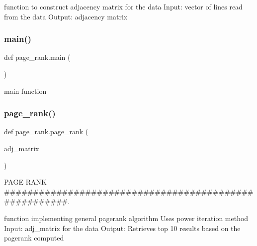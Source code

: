 \begin{DoxyVerb}function to construct adjacency matrix for the data
    Input: vector of lines read from the data
    Output: adjacency matrix
\end{DoxyVerb}
 \mbox{\label{namespacepage__rank_a8bd06af55f4293afdc3cc94d83cd6adc}} 
\subsubsection{\texorpdfstring{main()}{main()}}
{\footnotesize\ttfamily def page\+\_\+rank.\+main (\begin{DoxyParamCaption}{ }\end{DoxyParamCaption})}

\begin{DoxyVerb}main function \end{DoxyVerb}
 \mbox{\label{namespacepage__rank_a44383b8f4c9e38856601ddb814f958e5}} 
\subsubsection{\texorpdfstring{page\+\_\+rank()}{page\_rank()}}
{\footnotesize\ttfamily def page\+\_\+rank.\+page\+\_\+rank (\begin{DoxyParamCaption}\item[{}]{adj\+\_\+matrix }\end{DoxyParamCaption})}



P\+A\+GE R\+A\+NK \#\#\#\#\#\#\#\#\#\#\#\#\#\#\#\#\#\#\#\#\#\#\#\#\#\#\#\#\#\#\#\#\#\#\#\#\#\#\#\#\#\#\#\#\#\#\#\#\#\#\#\#\#\#. 

\begin{DoxyVerb}function implementing general pagerank algorithm
    Uses power iteration method
    Input: adj_matrix for the data
    Output: Retrieves top 10 results based on the pagerank computed 
\end{DoxyVerb}
 \mbox{\label{namespacepage__rank_a3d99bff5a56135120f17275a221d194d}} 
